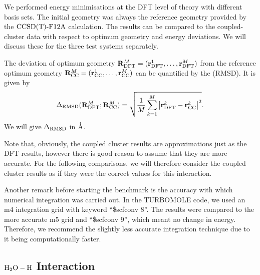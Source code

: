 \documentclass[8.5pt,twoside,twocolumn]{article}
\newcommand\dft{\enmat{_{\te{DFT}}}}
\newcommand\cc{\enmat{_{\te{CC}}}}
\renewcommand{\Ang}{\mathring{\te{A}}}
\renewcommand\r{\bo r}
\theoremstyle{standard}
\begin{document}
We performed energy minimisations at the DFT level of theory with different basis sets. The initial
geometry was always the reference geometry provided by the $\text{CCSD(T)-F12A}$ calculation. The results can be compared
to the coupled-cluster data with respect to optimum geometry and energy deviations. We will discuss
these for the three test systems separately.

The deviation of optimum geometry \mbox{$\bo R^M\dft=(\r^1\dft,\ldots,\r^M\dft)$} from the reference optimum geometry 
\mbox{$\bo R^M\cc=(\r^1\cc,\ldots,\r^M\cc)$} can be quantified by the  (RMSD). It
is given by
\newcommand{\DRMSD}{\Dl_{\te{RMSD}}}
\begin{equation}
\Dl_{\te{RMSD}}(\bo R^M\dft;\bo R^M\cc)=\sqrt{\frac 1 M \sum_{k=1}^M \abs{\r^k\dft-\r^k\cc}^2}.
\label{Bench:RMSD}
\end{equation}
We will give $\DRMSD$ in $\Ang$.   

Note that, obviously, the coupled cluster results are approximations just as the DFT results, however
there is good reason to assume that they are more accurate. For the following comparisons, we will
therefore consider the coupled cluster results as if they were the correct values for this
interaction.

Another remark before starting the benchmark is the accuracy with which numerical
integration was carried out. In the TURBOMOLE code, we used an m4 integration grid
with keyword ``\$scfconv 8''. The results were compared to the more accurate
m5 grid and ``\$scfconv 9'', which meant no change in energy. Therefore, we recommend
the slightly less accurate integration technique due to it being computationally
faster. 

\subsection{$\mbox{\ensuremath{\text H _2 \text O-\text H}}$ Interaction}
\end{document}
